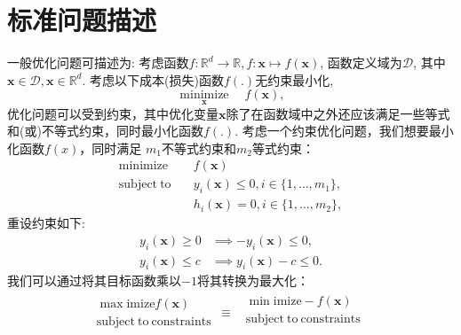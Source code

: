 \documentclass[lang=cn,10pt]{gorgeousnbook}
\numberwithin{equation}{section}%
\numberwithin{figure}{section}%
\begin{document}
\section{标准问题描述}
一般优化问题可描述为: 考虑函数$f:\mathbb{R}^d\to\mathbb{R},f:\boldsymbol{x}\mapsto f(\boldsymbol{x})$, 函数定义域为$\mathcal{D}$, 其中$\boldsymbol{x}\in\mathcal{D},\boldsymbol{x}\in\mathbb{R}^d$.
考虑以下成本(损失)函数$f(.)$无约束最小化,
\begin{equation}
	\underset{\boldsymbol{x}}{\operatorname*{minimize}}\quad f(\boldsymbol{x}), \label{equation_optimization_problem_unconstrained}
\end{equation}
优化问题可以受到约束，其中优化变量$\boldsymbol{x}$除了在函数域中之外还应该满足一些等式和(或)不等式约束，同时最小化函数$f(.)$. 考虑一个约束优化问题，我们想要最小化函数$f(x)$，同时满足 $m_1 $不等式约束和$ m_2 $等式约束：
\begin{equation}
	\begin{aligned}\mathrm{minimize}\quad&f(\boldsymbol{x})\\\mathrm{subject~to}\quad&y_i(\boldsymbol{x})\leq0,i\in\{1,\ldots,m_1\},\\&h_i(\boldsymbol{x})=0,i\in\{1,\ldots,m_2\},\end{aligned}\label{equation_optimization_problem}
\end{equation}
重设约束如下:
\begin{equation}
	\begin{aligned}y_i(\boldsymbol{x})\geq0&\implies-y_i(\boldsymbol{x})\leq0,\\y_i(\boldsymbol{x})\leq c&\implies y_i(\boldsymbol{x})-c\leq0.\end{aligned}
\end{equation}
我们可以通过将其目标函数乘以$-1$将其转换为最大化：
\begin{equation}
	\begin{array}{c}
		\max\mathrm{imize} f\left( \boldsymbol{x} \right)\\
		\mathrm{subject}\ \mathrm{to}\ \mathrm{constraints}\\
	\end{array}\begin{matrix}
		\equiv&		\begin{array}{c}
		\min\mathrm{imize} -f\left( \boldsymbol{x} \right)\\
		\mathrm{subject}\  \mathrm{to}\ \mathrm{constraints}\\
	\end{array}\\
	\end{matrix}\label{4.1.4}
\end{equation}
\end{document}
